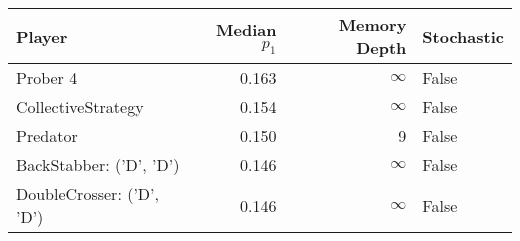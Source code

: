 \begin{tabular}{lrrl}
\toprule
                    Player &  Median $p_1$ &  Memory Depth & Stochastic \\
\midrule
                  Prober 4 &         0.163 &            \(\infty\) &      False \\
        CollectiveStrategy &         0.154 &            \(\infty\) &      False \\
                  Predator &         0.150 &             9 &      False \\
   BackStabber: ('D', 'D') &         0.146 &            \(\infty\) &      False \\
 DoubleCrosser: ('D', 'D') &         0.146 &            \(\infty\) &      False \\
\bottomrule
\end{tabular}
